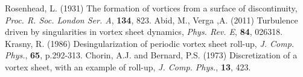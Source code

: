\documentclass{article}
\begin{document}
\newpage
\begin{thebibliography}{99}
 Rosenhead, L. (1931) The formation of vortices from a surface of discontinuity, \emph{Proc. R. Soc. London Ser. A}, {\bf 134}, 823.
 Abid, M., Verga ,A. (2011) Turbulence driven by singularities in vortex sheet dynamics, \emph{Phys. Rev. E}, {\bf 84}, 026318.
 Krasny, R. (1986) Desingularization of periodic vortex sheet roll-up, \emph{J. Comp. Phys.}, {\bf 65}, p.292-313. 
 Chorin, A.J. and Bernard, P.S. (1973) Discretization of a vortex sheet, with an example of roll-up, \emph{J. Comp. Phys.}, {\bf 13}, 423.
\end{thebibliography}
\end{document}
